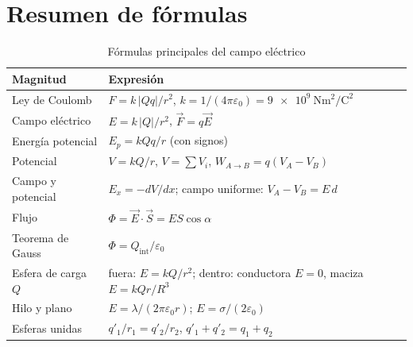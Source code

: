 \section{Resumen de fórmulas}\label{sec:ele-resumen}

\begin{table}[H]
    \centering
    \caption{Fórmulas principales del campo eléctrico}
    \vspace{-5pt}
    \begin{tabular}{@{}lL{10cm}@{}}
        \toprule
        \textbf{Magnitud} & \textbf{Expresión} \\
        \midrule
        Ley de Coulomb & \(F = k\,|Q q|/r^2\), \quad \(k = 1/(4\pi\varepsilon_0) = \qty{9e9}{\newton\m\squared\per\coulomb\squared}\) \\[3pt]
        Campo eléctrico & \(E = k\,|Q|/r^2\), \quad \(\vec F = q\vec E\) \\[3pt]
        Energía potencial & \(E_p = kQq/r\) (con signos) \\[3pt]
        Potencial & \(V = kQ/r\), \quad \(V = \sum V_i\), \quad \(W_{A\to B} = q(V_A - V_B)\) \\[3pt]
        Campo y potencial & \(E_x = -dV/dx\); \quad campo uniforme: \(V_A - V_B = E\,d\) \\[3pt]
        Flujo & \(\Phi = \vec E\cdot\vec S = E S\cos\alpha\) \\[3pt]
        Teorema de Gauss & \(\Phi = Q_{\text{int}}/\varepsilon_0\) \\[3pt]
        Esfera de carga \(Q\) & fuera: \(E = kQ/r^2\); \quad dentro: conductora \(E = 0\), maciza \(E = kQr/R^3\) \\[3pt]
        Hilo y plano & \(E = \lambda/(2\pi\varepsilon_0 r)\); \quad \(E = \sigma/(2\varepsilon_0)\) \\[3pt]
        Esferas unidas & \(q'_1/r_1 = q'_2/r_2\), \quad \(q'_1 + q'_2 = q_1 + q_2\) \\
        \bottomrule
    \end{tabular}
    \label{tab:ele-resumen}
\end{table}

